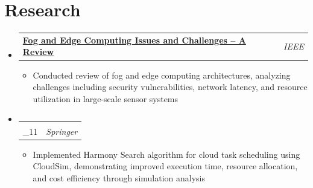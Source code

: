 \documentclass[letterpaper,11pt]{article}
\makeatletter
\newcommand{\resumeItem}[2]{
  \item{
    \textbf{#1}{: #2 \vspace{-2pt}}
  }
}
\newcommand{\resumeResearchHeading}[2]{
  \vspace{0pt}\item
    \begin{tabular*}{\textwidth}{l@{\extracolsep{\fill}}r}
      \textbf{#1} & \textit{#2} \\
    \end{tabular*}\vspace{-6pt}
}
\newcommand{\resumeSubHeadingListStart}{\begin{itemize}[leftmargin=0pt,label={},itemsep=-2pt]}
\newcommand{\resumeSubHeadingListEnd}{\end{itemize}}
\newcommand{\resumeItemListStart}{\begin{itemize}[leftmargin=12pt, nosep, topsep=2pt]}
\newcommand{\resumeItemListEnd}{\end{itemize}}
\renewcommand{\resumeItem}[2]{
  \item {#2}
}
\makeatother
\begin{document}

\section{Research}
  \resumeSubHeadingListStart
    \resumeResearchHeading
      {\href{https://www.sciencedirect.com/science/article/pii/S2667345224000051?via\\%3Dihub}{Neural Network Inspired Efficient Scalable Task Scheduling for Cloud Infrastructure}}{Elsevier}
      \resumeItemListStart
        \resumeItem{Algorithm Development}
          {Proposed ANN-inspired task scheduling algorithm for cloud infrastructure, achieving constant-time prediction performance and improved scalability under increasing task loads}
        \resumeItem{System Performance}
          {Demonstrated improved efficiency across execution time, resource utilization, failure rates, and power consumption metrics under both underloaded and overloaded conditions}
      \resumeItemListEnd
    \resumeResearchHeading
      {\href{https://ieeexplore.ieee.org/abstract/document/10444593}{Fog and Edge Computing Issues and Challenges -- A Review}}{IEEE}
      \resumeItemListStart
        \resumeItem{Comprehensive Analysis}
          {Conducted review of fog and edge computing architectures, analyzing challenges including security vulnerabilities, network latency, and resource utilization in large-scale sensor systems}
      \resumeItemListEnd
    \resumeResearchHeading
      {\href{https://link.springer.com/chapter/10.1007/978-3-031-08815-5\\_11}{Neural Network Based Task Scheduling in Cloud Using Harmony Search Algorithm}}{Springer}
      \resumeItemListStart
        \resumeItem{Algorithm Implementation}
          {Implemented Harmony Search algorithm for cloud task scheduling using CloudSim, demonstrating improved execution time, resource allocation, and cost efficiency through simulation analysis}
      \resumeItemListEnd
  \resumeSubHeadingListEnd
\end{document}
